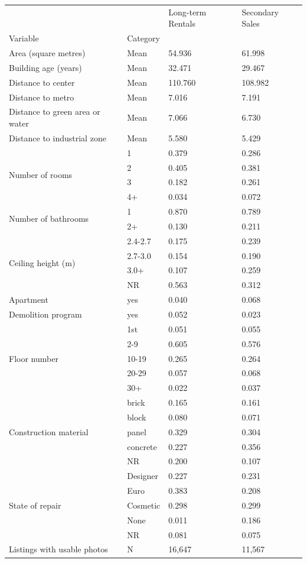 \begin{tabular}{llll}
\toprule
 &  & Long-term Rentals & Secondary Sales \\
Variable & Category &  &  \\
\midrule
Area (square metres) & Mean & 54.936 & 61.998 \\
\cline{1-4}
Building age (years) & Mean & 32.471 & 29.467 \\
\cline{1-4}
Distance to center & Mean & 110.760 & 108.982 \\
\cline{1-4}
Distance to metro & Mean & 7.016 & 7.191 \\
\cline{1-4}
Distance to green area or water & Mean & 7.066 & 6.730 \\
\cline{1-4}
Distance to industrial zone & Mean & 5.580 & 5.429 \\
\cline{1-4}
\multirow[t]{4}{*}{Number of rooms} & 1 & 0.379 & 0.286 \\
 & 2 & 0.405 & 0.381 \\
 & 3 & 0.182 & 0.261 \\
 & 4+ & 0.034 & 0.072 \\
\cline{1-4}
\multirow[t]{2}{*}{Number of bathrooms} & 1 & 0.870 & 0.789 \\
 & 2+ & 0.130 & 0.211 \\
\cline{1-4}
\multirow[t]{4}{*}{Ceiling height (m)} & 2.4-2.7 & 0.175 & 0.239 \\
 & 2.7-3.0 & 0.154 & 0.190 \\
 & 3.0+ & 0.107 & 0.259 \\
 & NR & 0.563 & 0.312 \\
\cline{1-4}
Apartment & yes & 0.040 & 0.068 \\
\cline{1-4}
Demolition program & yes & 0.052 & 0.023 \\
\cline{1-4}
\multirow[t]{5}{*}{Floor number} & 1st & 0.051 & 0.055 \\
 & 2-9 & 0.605 & 0.576 \\
 & 10-19 & 0.265 & 0.264 \\
 & 20-29 & 0.057 & 0.068 \\
 & 30+ & 0.022 & 0.037 \\
\cline{1-4}
\multirow[t]{5}{*}{Construction material} & brick & 0.165 & 0.161 \\
 & block & 0.080 & 0.071 \\
 & panel & 0.329 & 0.304 \\
 & concrete & 0.227 & 0.356 \\
 & NR & 0.200 & 0.107 \\
\cline{1-4}
\multirow[t]{5}{*}{State of repair} & Designer & 0.227 & 0.231 \\
 & Euro & 0.383 & 0.208 \\
 & Cosmetic & 0.298 & 0.299 \\
 & None & 0.011 & 0.186 \\
 & NR & 0.081 & 0.075 \\
\cline{1-4}
Listings with usable photos & N & 16,647 & 11,567 \\
\cline{1-4}
\bottomrule
\end{tabular}
